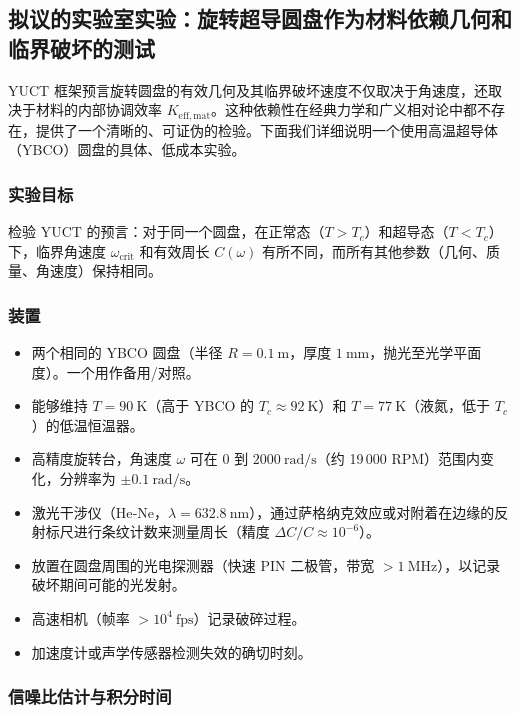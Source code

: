 \documentclass[12pt,a4paper]{article}
\begin{document}
	\subsection{拟议的实验室实验：旋转超导圆盘作为材料依赖几何和临界破坏的测试}
	
	YUCT 框架预言旋转圆盘的有效几何及其临界破坏速度不仅取决于角速度，还取决于材料的内部协调效率 \(K_{\mathrm{eff,mat}}\)。这种依赖性在经典力学和广义相对论中都不存在，提供了一个清晰的、可证伪的检验。下面我们详细说明一个使用高温超导体（YBCO）圆盘的具体、低成本实验。
	
	\subsubsection{实验目标}
	
	检验 YUCT 的预言：对于同一个圆盘，在正常态（\(T > T_c\)）和超导态（\(T < T_c\)）下，临界角速度 \(\omega_{\text{crit}}\) 和有效周长 \(C(\omega)\) 有所不同，而所有其他参数（几何、质量、角速度）保持相同。
	
	\subsubsection{装置}
	
	\begin{itemize}
		\item 两个相同的 YBCO 圆盘（半径 \(R = 0.1\ \text{m}\)，厚度 \(1\ \text{mm}\)，抛光至光学平面度）。一个用作备用/对照。
		\item 能够维持 \(T = 90\ \text{K}\)（高于 YBCO 的 \(T_c \approx 92\ \text{K}\)）和 \(T = 77\ \text{K}\)（液氮，低于 \(T_c\)）的低温恒温器。
		\item 高精度旋转台，角速度 \(\omega\) 可在 0 到 \(2000\ \text{rad/s}\)（约 19 000 RPM）范围内变化，分辨率为 \(\pm 0.1\ \text{rad/s}\)。
		\item 激光干涉仪（He‑Ne，\(\lambda = 632.8\ \text{nm}\)），通过萨格纳克效应或对附着在边缘的反射标尺进行条纹计数来测量周长（精度 \(\Delta C/C \approx 10^{-6}\)）。
		\item 放置在圆盘周围的光电探测器（快速 PIN 二极管，带宽 \(> 1\ \text{MHz}\)），以记录破坏期间可能的光发射。
		\item 高速相机（帧率 \(> 10^4\ \text{fps}\)）记录破碎过程。
		\item 加速度计或声学传感器检测失效的确切时刻。
	\end{itemize}
	
	\subsubsection{信噪比估计与积分时间}
	
\end{document}
